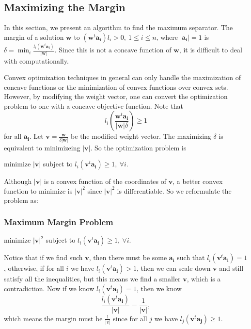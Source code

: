 \subsection{Maximizing the Margin}

In this section, we present an algorithm to find the maximum separator. The margin of a solution \(\mathbf{w} \) to \(\left( \mathbf{w} ^t \mathbf{a_i}  \right) l_i > 0, \ 1 \le i \le n \), where \(\lvert \mathbf{a_i} \rvert = 1 \) is \(\delta  = \min _i \frac{l_i \left( \mathbf{w} ^t \mathbf{a_i}  \right) }{\vert \mathbf{w}  \vert }\). Since this is not a concave function of \(\mathbf{w} \), it is difficult to deal with computationally.     

Convex optimization techniques in general can only handle the maximization of concave functions or the minimization of convex functions over convex sets. However, by modifying the weight vector, one can convert the optimization problem to one with a concave objective function. Note that
\[
    l_i \left( \frac{\mathbf{w} ^t \mathbf{a_i} }{\vert \mathbf{w}  \vert \delta  } \right) \ge 1 
\]
for all \(\mathbf{a_i} \). Let \(\mathbf{v} = \frac{\mathbf{w} }{\delta  \vert \mathbf{w}  \vert }\) be the modified weight vector. The maximizing \(\delta \) is equivalent to minimizeing \(\vert \mathbf{v}  \vert \). So the optimization problem is 
\begin{center}
    minimize \(\vert \mathbf{v}  \vert \) subject to \(l_i \left( \mathbf{v} ^t \mathbf{a_i}  \right) \ge 1, \ \forall i \). 
\end{center}   
Although \(\vert \mathbf{v}  \vert \) is a convex function of the coordinates of \(\mathbf{v} \), a better convex function to minimize is \(\vert \mathbf{v}  \vert^2 \) since \(\vert \mathbf{v}  \vert^2 \) is differentiable. So we reformulate the problem as: 
\subsubsection{Maximum Margin Problem}   

\begin{center}
    minimize \(\vert \mathbf{v}  \vert^2 \) subject to \(l_i \left( \mathbf{v} ^t \mathbf{a_i}  \right) \ge 1, \ \forall i \). 
\end{center}  

\begin{note}
    Notice that if we find such \(\mathbf{v} \), then there must be some \(\mathbf{a_i} \) such that \(l_i \left( \mathbf{v} ^t \mathbf{a_i}  \right) = 1 \), otherwise, if for all \(i\) we have \(l_i \left( \mathbf{v} ^t \mathbf{a_i}  \right) > 1\), then we can scale down \(\mathbf{v} \) and still satisfy all the inequalities, but this means we find a smaller \(\mathbf{v} \), which is a contradiction. Now if we know \(l_i \left( \mathbf{v} ^t \mathbf{a_i}  \right) = 1 \), then we know
    \[
        \frac{l_i \left( \mathbf{v} ^t \mathbf{a_i}  \right) }{\vert \mathbf{v}  \vert } = \frac{1}{\vert \mathbf{v}  \vert }, 
    \]   which means the margin must be \(\frac{1}{\vert v \vert }\) since for all \(j\) we have \(l_j \left( \mathbf{v} ^t \mathbf{a_j}  \right) \ge 1\).        
\end{note}

